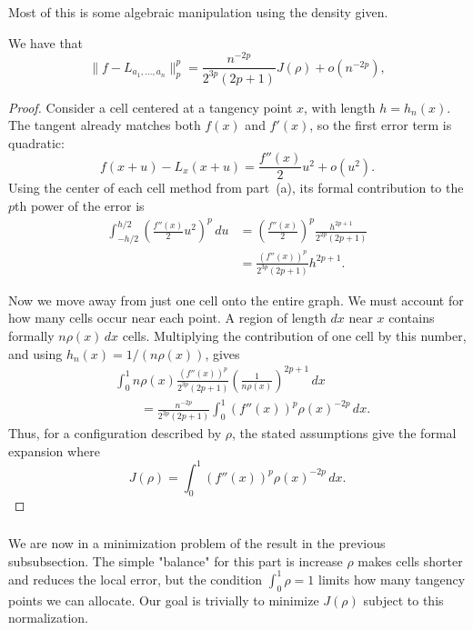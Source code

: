 \documentclass[11pt]{scrartcl}
\begin{document}
\begin{soln}
    \subsubsection*{}
    Most of this is some algebraic manipulation using the density given.
\begin{claim*}
     We have that \[
        \bigl\|f-L_{a_1,\ldots,a_n}\bigr\|_p^p
        =\frac{n^{-2p}}{2^{3p}(2p+1)}J(\rho)
        +o(n^{-2p}),
    \]
\end{claim*}
\begin{proof}
    
    Consider a cell centered at a tangency point $x$, with length
    $h=h_n(x)$. The tangent already matches both $f(x)$ and $f'(x)$,
    so the first error term is quadratic:
    \[
    f(x+u)-L_x(x+u)
    =\frac{f''(x)}2u^2+o(u^2).
    \]
    Using the center of each cell method from part~(a), its formal
    contribution to the $p$th power of the error is
    \begin{align*}
        \int_{-h/2}^{h/2}
        \left(\frac{f''(x)}2u^2\right)^p\,du
        &=\left(\frac{f''(x)}2\right)^p
          \frac{h^{2p+1}}{2^{2p}(2p+1)}\\
        &=\frac{(f''(x))^p}{2^{3p}(2p+1)}h^{2p+1}.
    \end{align*}

    Now we move away from just one cell onto the entire graph. We must account for
    how many cells occur near each point. A region of length $dx$ near
    $x$ contains formally $n\rho(x)\,dx$ cells. Multiplying the
    contribution of one cell by this number, and using
    $h_n(x)=1/(n\rho(x))$, gives
    \begin{align*}
        &\int_0^1 n\rho(x)
        \frac{(f''(x))^p}{2^{3p}(2p+1)}
        \left(\frac1{n\rho(x)}\right)^{2p+1}\,dx\\
        &\qquad=
        \frac{n^{-2p}}{2^{3p}(2p+1)}
        \int_0^1(f''(x))^p\rho(x)^{-2p}\,dx.
    \end{align*}
    Thus, for a configuration described by $\rho$, the stated
    assumptions give the formal expansion
    where
    \[
    J(\rho)=\int_0^1(f''(x))^p\rho(x)^{-2p}\,dx.
    \]
\end{proof}


    \subsubsection*{}
    We are now in a minimization problem of the result in the previous subsubsection.
    The simple "balance" for this part is increase  $\rho$ makes cells shorter and reduces the local error,
    but the condition $\int_0^1\rho=1$ limits how many tangency points
    we can allocate. Our goal is trivially to minimize $J(\rho)$ subject to this
    normalization.


\end{soln}
\end{document}
